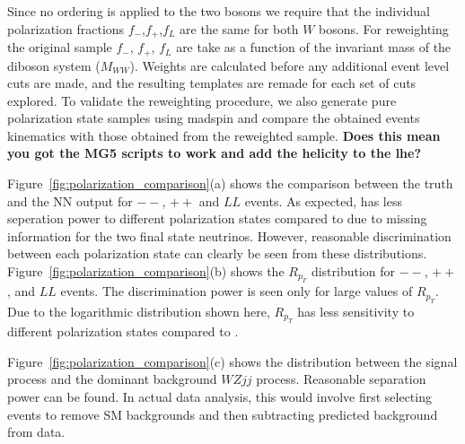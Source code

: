 \normalsize Since no ordering is applied to the two bosons we require
that the individual polarization fractions $f_-$,$f_+$,$f_L$ are the
same for both $W$ bosons.  For reweighting the original sample $f_-$,
$f_+$, $f_L$ are take as a function of the invariant mass of the
diboson system ($M_{WW}$).  Weights are calculated before any
additional event level cuts are made, and the resulting templates are
remade for each set of cuts explored.  
To validate the reweighting procedure, we also generate pure polarization state samples using {\sc
  madspin} and compare the obtained events kinematics with those
obtained from the reweighted sample. {\bf Does this mean you got the
  MG5 scripts to work and add the helicity to the lhe?}
 
Figure~\ref{fig:polarization_comparison}(a) shows the comparison between the truth \cts and 
the NN output \ctsNN for $--$, $++$ and $LL$ events. As expected, \ctsNN has less seperation 
power to different polarization states compared to \cts due to missing information for the two final state neutrinos. 
However, reasonable discrimination between each polarization state can clearly be seen from these distributions. 
Figure~\ref{fig:polarization_comparison}(b) shows the $R_{p_T}$ distribution for $--$, $++$, and $LL$ events. 
The discrimination power is seen only for large values of $R_{p_T}$. Due to the logarithmic distribution shown here, 
$R_{p_T}$ has less sensitivity to different polarization states compared to \ctsNN.

Figure~\ref{fig:polarization_comparison}(c) shows the \ctsNN distribution between the signal \ssWW process and the dominant background $WZjj$ process. 
Reasonable separation power can be found. In actual data analysis, this would involve first selecting
events to remove SM backgrounds and then subtracting predicted background from data. 

